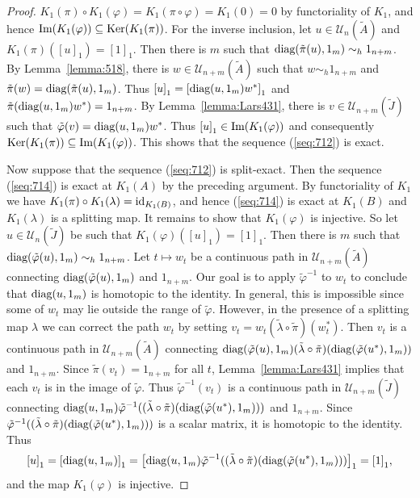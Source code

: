 \documentclass{book}
\def\diag{\textnormal{diag}}
\begin{document}
\begin{proof}
  \(K_1(\pi)\circ K_1(\varphi)=K_1(\pi\circ\varphi)=K_1(0)=0\) by functoriality of \(K_1\), and hence
  \(\textnormal{Im}(K_1(\varphi))\subseteq \textnormal{Ker}(K_1(\pi))\). For the inverse inclusion, let \(u\in\mathcal{U}_n(\tilde{A})\) and \(K_1(\pi)({[u]}_1)={[1]}_1\).
  Then there is \(m\) such that \(\diag(\tilde{\pi}(u),1_m)\sim_h 1_{n+m}\).
  By Lemma~\ref{lemma:518}, there is \(w\in\mathcal{U}_{n+m}(\tilde{A})\) such that \(w\sim_h 1_{n+m}\)
  and \(\tilde{\pi}(w)=\diag(\tilde{\pi}(u),1_m)\). Thus \({[u]}_1={[\diag(u,1_m)w^*]}_1\) and \(\tilde{\pi}(\diag(u,1_m)w^*)=1_{n+m}\).
  By Lemma~\ref{lemma:Lars431}, there is \(v\in\mathcal{U}_{n+m}(\tilde{J})\) such that \(\tilde{\varphi}(v)=\diag(u,1_m)w^*\).
  Thus \({[u]}_1\in\textnormal{Im}(K_1(\varphi))\) and consequently \(\textnormal{Ker}(K_1(\pi))\subseteq\textnormal{Im}(K_1(\varphi))\). This shows that the sequence (\ref{seq:712}) is exact.\par
  Now suppose that the sequence (\ref{seq:712}) is split-exact. Then the sequence (\ref{seq:714}) is exact at \(K_1(A)\) by the preceding argument.
  By functoriality of \(K_1\) we have \(K_1(\pi)\circ K_1(\lambda)=\textnormal{id}_{K_1(B)}\),
  and hence (\ref{seq:714}) is exact at \(K_1(B)\) and \(K_1(\lambda)\) is a splitting map.
  It remains to show that \(K_1(\varphi)\) is injective. So let \(u\in\mathcal{U}_n(\tilde{J})\) be such that \(K_1(\varphi)({[u]}_1)={[1]}_1\).
  Then there is \(m\) such that \(\diag(\tilde{\varphi}(u),1_m)\sim_h 1_{n+m}\). Let \(t\mapsto w_t\) be a continuous path in \(\mathcal{U}_{n+m}(\tilde{A})\) connecting
  \(\diag(\tilde{\varphi}(u),1_m)\) and \(1_{n+m}\). Our goal is to apply \(\tilde{\varphi}^{-1}\) to \(w_t\) to conclude that \(\diag(u,1_m)\) is homotopic to the identity.
  In general, this is impossible since some of \(w_t\) may lie outside the range of \(\tilde{\varphi}\). However, in the presence of a splitting map \(\lambda\) we can correct the path \(w_t\) by setting \(v_t=w_t(\tilde{\lambda}\circ\tilde{\pi})(w_t^*)\). Then \(v_t\) is a continuous
  path in \(\mathcal{U}_{n+m}(\tilde{A})\) connecting \(\diag(\tilde{\varphi}(u),1_{m})(\tilde{\lambda}\circ\tilde{\pi})(\diag(\tilde{\varphi}(u^*),1_m))\) and \(1_{n+m}\).
  Since \(\tilde{\pi}(v_t)=1_{n+m}\) for all \(t\), Lemma~\ref{lemma:Lars431} implies that each \(v_t\) is in the image of \(\tilde{\varphi}\).
  Thus \(\tilde{\varphi}^{-1}(v_t)\) is a continuous path in \(\mathcal{U}_{n+m}(\tilde{J})\) connecting \(\diag(u,1_m)\tilde{\varphi}^{-1}((\tilde{\lambda}\circ\tilde{\pi})(\diag(\tilde{\varphi}(u^*),1_m)))\) and \(1_{n+m}\).
  Since \(\tilde{\varphi}^{-1}((\tilde{\lambda}\circ\tilde{\pi})(\diag(\tilde{\varphi}(u^*),1_m)))\) is a scalar matrix, it is homotopic to the identity. Thus
  \[
    {[u]}_1={[\diag(u,1_m)]}_1={\left[\diag(u,1_m)\tilde{\varphi}^{-1}((\tilde{\lambda}\circ\tilde{\pi})(\diag(\tilde{\varphi}(u^*),1_m)))\right]}_1={[1]}_1,
  \]
  and the map \(K_1(\varphi)\) is injective.
\end{proof}
\end{document}
